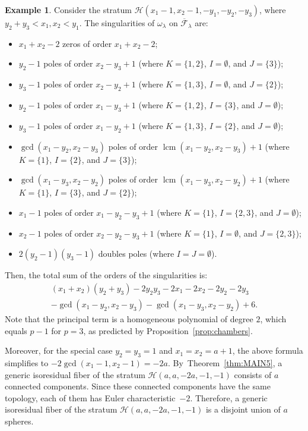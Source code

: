 \documentclass[11pt]{article}
\DeclareMathOperator{\lcm}{lcm}
\theoremstyle{definition}
\newtheorem{ex}[thm]{Example}
\begin{document}
\begin{ex}
Consider the stratum $\mathcal{H}(x_{1}-1,x_{2}-1,-y_{1},-y_{2},-y_{3})$, where $y_{2}+y_{3}<x_{1},x_{2}<y_{1}$. The singularities of $\omega_{\lambda}$ on $\overline{\mathcal F}_\lambda$ are:
\begin{itemize}
\item $x_{1}+x_{2}-2$ zeros of order $x_{1}+x_{2}-2$;
\item $y_{2}-1$ poles of order $x_{2}-y_{3}+1$ (where $K=\lbrace{ 1,2 \rbrace}$, $I=\emptyset$, and $J=\lbrace{ 3 \rbrace}$);
\item $y_{3}-1$ poles of order $x_{2}-y_{2}+1$ (where $K=\lbrace{ 1,3 \rbrace}$, $I=\emptyset$, and $J=\lbrace{ 2 \rbrace}$);
\item $y_{2}-1$ poles of order $x_{1}-y_{3}+1$ (where $K=\lbrace{ 1,2 \rbrace}$, $I=\lbrace{ 3 \rbrace}$, and $J=\emptyset$);
\item $y_{3}-1$ poles of order $x_{1}-y_{2}+1$ (where $K=\lbrace{ 1,3 \rbrace}$, $I=\lbrace{ 2 \rbrace}$, and $J=\emptyset$);
\item $\gcd(x_{1}-y_{2},x_{2}-y_{3})$ poles of order $\lcm(x_{1}-y_{2},x_{2}-y_{3})+1$ (where $K=\lbrace{ 1 \rbrace}$, $I=\lbrace{ 2 \rbrace}$, and $J=\lbrace{ 3 \rbrace}$);
\item $\gcd(x_{1}-y_{3},x_{2}-y_{2})$ poles of order $\lcm(x_{1}-y_{3},x_{2}-y_{2})+1$ (where $K=\lbrace{ 1 \rbrace}$, $I=\lbrace{ 3 \rbrace}$, and $J=\lbrace{ 2 \rbrace}$);
\item $x_{1}-1$ poles of order $x_{1}-y_{2}-y_{3}+1$ (where $K=\lbrace{ 1 \rbrace}$, $I=\lbrace{2,3 \rbrace}$, and $J=\emptyset$);
\item $x_{2}-1$ poles of order $x_{2}-y_{2}-y_{3}+1$ (where $K=\lbrace{ 1 \rbrace}$, $I=\emptyset$, and $J=\lbrace{2,3 \rbrace}$);
\item $2(y_{2}-1)(y_{3}-1)$ doubles poles (where $I=J=\emptyset$).
\end{itemize}
Then, the total sum of the orders of the singularities is:
\begin{multline*}
(x_{1}+x_{2})(y_{2}+y_{3})
-2y_{2}y_{3}
-2x_{1}
-2x_{2}
-2y_{2}
-2y_{3}\\
-\gcd(x_{1}-y_{2},x_{2}-y_{3})
-\gcd(x_{1}-y_{3},x_{2}-y_{2})
+6.
\end{multline*}
Note that the principal term is a homogeneous polynomial of degree $2$, which equals $p-1$ for $p=3$, as predicted by Proposition~\ref{prop:chambers}.

Moreover, for the special case $y_{2}=y_{3}=1$ and $x_1 = x_2 = a+1$, the above formula simplifies to $-2\gcd(x_{1}-1,x_{2}-1) = -2a$. By~Theorem~\ref{thm:MAIN5},
a generic isoresidual fiber of the stratum $\mathcal{H}(a,a,-2a,-1,-1)$ consists of $a$ connected components. Since these connected components have the same topology, each of them has Euler characteristic~$-2$. Therefore, a generic isoresidual fiber of the stratum $\mathcal{H}(a,a,-2a,-1,-1)$ is a disjoint union of $a$ spheres.
\end{ex}
\end{document}
